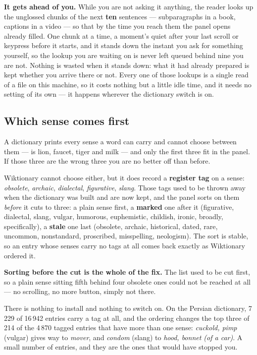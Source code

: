 \documentclass[11pt,oneside]{report}
\newcommand{\pw}[1]{\babelsublr{\mbox{\foreignlanguage{persian}{#1}}}}
\newcommand{\menu}[1]{\textsf{#1}}
\begin{document}
\begin{goodbox}
\textbf{It gets ahead of you.} While you are not asking it anything, the
reader looks up the unglossed chunks of the next \textbf{ten} sentences ---
subparagraphs in a book, captions in a video --- so that by the time you reach
them the panel opens already filled. One chunk at a time, a moment's quiet
after your last scroll or keypress before it starts, and it stands down the
instant you ask for something yourself, so the lookup you are waiting on is
never left queued behind nine you are not. Nothing is wasted when it stands
down: what it had already prepared is kept whether you arrive there or not.
Every one of those lookups is a single read of a file on this machine, so it
costs nothing but a little idle time, and it needs no setting of its own ---
it happens wherever the \menu{dictionary} switch is on.
\end{goodbox}

\subsection*{Which sense comes first}

A dictionary prints every sense a word can carry and cannot choose between
them --- \pw{شیر} is lion, faucet, tiger and milk --- and only the first three
fit in the panel. If those three are the wrong three you are no better off
than before.

Wiktionary cannot choose either, but it does record a \textbf{register tag}
on a sense: \emph{obsolete}, \emph{archaic}, \emph{dialectal},
\emph{figurative}, \emph{slang}. Those tags used to be thrown away when the
dictionary was built and are now kept, and the panel sorts on them
\emph{before} it cuts to three: a plain sense first, a \textbf{marked} one
after it (figurative, dialectal, slang, vulgar, humorous, euphemistic,
childish, ironic, broadly, specifically), a \textbf{stale} one last
(obsolete, archaic, historical, dated, rare, uncommon, nonstandard,
proscribed, misspelling, neologism). The sort is stable, so an entry whose
senses carry no tags at all comes back exactly as Wiktionary ordered it.

\textbf{Sorting before the cut is the whole of the fix.} The list used to be
cut first, so a plain sense sitting fifth behind four obsolete ones could not
be reached at all --- no scrolling, no more button, simply not there.

There is nothing to install and nothing to switch on. On the Persian
dictionary, 7\,229 of 16\,942 entries carry a tag at all, and the ordering
changes the top three of 214 of the 4\,870 tagged entries that have more than
one sense: \emph{cuckold, pimp} (vulgar) gives way to \emph{mover}, and
\emph{condom} (slang) to \emph{hood, bonnet (of a car)}. A small number of
entries, and they are the ones that would have stopped you.
\end{document}
